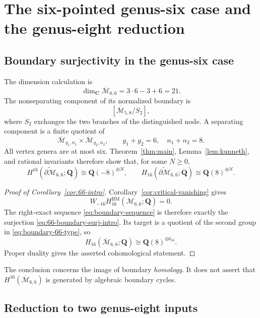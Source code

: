 \documentclass[12pt,reqno]{amsart}
\newcommand{\Q}{\mathbf{Q}}
\newcommand{\C}{\mathbf{C}}
\newcommand{\M}{\mathcal{M}}
\newcommand{\Mbar}{\overline{\mathcal{M}}}
\newcommand{\BM}{\mathrm{BM}}
\theoremstyle{definition}
\theoremstyle{remark}
\begin{document}
\section{The six-pointed genus-six case and the genus-eight reduction}
\label{sec:consequences}

\subsection{Boundary surjectivity in the genus-six case}

The dimension calculation is
\[
 \dim_{\C}\Mbar_{6,6}=3\cdot6-3+6=21.
\]
The nonseparating component of its normalized boundary is
\begin{equation}\label{eq:nonsep-66}
 [\Mbar_{5,8}/S_2],
\end{equation}
where $S_2$ exchanges the two branches of the distinguished node.  A
separating component is a finite quotient of
\begin{equation}\label{eq:sep-66}
 \Mbar_{g_1,n_1}\times\Mbar_{g_2,n_2},
 \qquad g_1+g_2=6,
 \quad n_1+n_2=8.
\end{equation}
All vertex genera are at most six.  Theorem~\ref{thm:main},
Lemma~\ref{lem:kunneth}, and rational invariants therefore show that, for
some $N\geq0$,
\begin{equation}\label{eq:boundary-66-type}
 H^{16}(\widetilde{\partial\M}_{6,6};\Q)
 \cong\Q(-8)^{\oplus N},
 \qquad
 H_{16}(\widetilde{\partial\M}_{6,6};\Q)
 \cong\Q(8)^{\oplus N}.
\end{equation}

\begin{proof}[Proof of Corollary~\ref{cor:66-intro}]
Corollary~\ref{cor:critical-vanishing} gives
\[
 W_{-16}H^{\BM}_{16}(\M_{6,6};\Q)=0.
\]
The right-exact sequence \eqref{eq:boundary-sequence} is therefore exactly
the surjection \eqref{eq:66-boundary-surj-intro}.  Its target is a quotient
of the second group in \eqref{eq:boundary-66-type}, so
\[
 H_{16}(\Mbar_{6,6};\Q)\cong\Q(8)^{\oplus b_{16}}.
\]
Proper duality gives the asserted cohomological statement.
\end{proof}

The conclusion concerns the image of boundary \emph{homology}.  It does not
assert that $H^{16}(\Mbar_{6,6})$ is generated by algebraic boundary cycles.

\subsection{Reduction to two genus-eight inputs}
\end{document}
